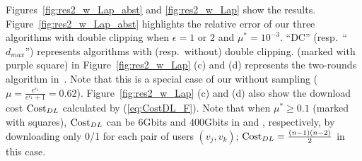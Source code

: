 
Figures~\ref{fig:res2_w_Lap_abst} and \ref{fig:res2_w_Lap} show the results. 
Figure~\ref{fig:res2_w_Lap_abst} highlights the relative error of our three algorithms with double clipping when $\epsilon=1$ or $2$ and $\mu^*=10^{-3}$. 
``DC'' (resp.~``$d_{max}$'') represents algorithms with (resp.~without) double clipping. 
\AlgSec{} (marked with purple square) in Figure~\ref{fig:res2_w_Lap} (c) and (d) represents the two-rounds algorithm in~\cite{Imola_USENIX21}. 
Note that this is a special case of our \AlgOne{} without sampling ($\mu =\frac{e^{\epsilon_1}}{e^{\epsilon_1}+1} = 0.62$). 
Figure~\ref{fig:res2_w_Lap} (c) and (d) also show the download cost $\mathrm{Cost}_{DL}$ calculated by 
(\ref{eq:CostDL_F}). 
Note that 
when $\mu^* \geq 0.1$ (marked with squares), 
$\mathrm{Cost}_{DL}$ can be $6$Gbits and $400$Gbits in \GPlus{} and \IMDB{}, respectively, by downloading only 0/1 for each pair of users $(v_j,v_k)$; $\mathrm{Cost}_{DL} = \frac{(n-1)(n-2)}{2}$ in this case. 

